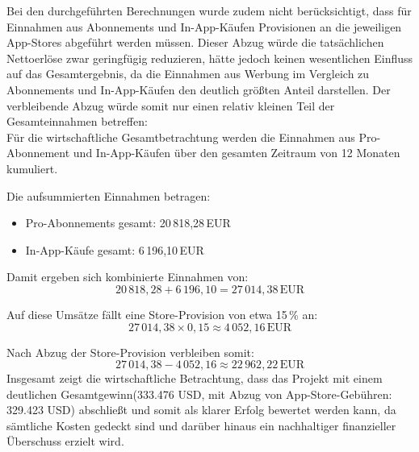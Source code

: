 Bei den durchgeführten Berechnungen wurde zudem nicht berücksichtigt, dass für Einnahmen aus Abonnements und In-App-Käufen Provisionen an die jeweiligen App-Stores abgeführt werden müssen. Dieser Abzug würde die tatsächlichen Nettoerlöse zwar geringfügig reduzieren, hätte jedoch keinen wesentlichen Einfluss auf das Gesamtergebnis, da die Einnahmen aus Werbung im Vergleich zu Abonnements und In-App-Käufen den deutlich größten Anteil darstellen. Der verbleibende Abzug würde somit nur einen relativ kleinen Teil der Gesamteinnahmen betreffen:\\
Für die wirtschaftliche Gesamtbetrachtung werden die Einnahmen aus Pro-Abonnement und In-App-Käufen über den gesamten Zeitraum von 12 Monaten kumuliert.

Die aufsummierten Einnahmen betragen:
\begin{itemize}
    \item Pro-Abonnements gesamt: 20\,818{,}28\,EUR
    \item In-App-Käufe gesamt: 6\,196{,}10\,EUR
\end{itemize}

Damit ergeben sich kombinierte Einnahmen von:
\[
20\,818{,}28 + 6\,196{,}10 = 27\,014{,}38\,\text{EUR}
\]

Auf diese Umsätze fällt eine Store-Provision von etwa 15\,\% an:
\[
27\,014{,}38 \times 0{,}15 \approx 4\,052{,}16\,\text{EUR}
\]

Nach Abzug der Store-Provision verbleiben somit:
\[
27\,014{,}38 - 4\,052{,}16 \approx 22\,962{,}22\,\text{EUR}
\]
Insgesamt zeigt die wirtschaftliche Betrachtung, dass das Projekt mit einem deutlichen Gesamtgewinn(333.476 USD, mit Abzug von App-Store-Gebühren: 329.423 USD) abschließt und somit als klarer Erfolg bewertet werden kann, da sämtliche Kosten gedeckt sind und darüber hinaus ein nachhaltiger finanzieller Überschuss erzielt wird.